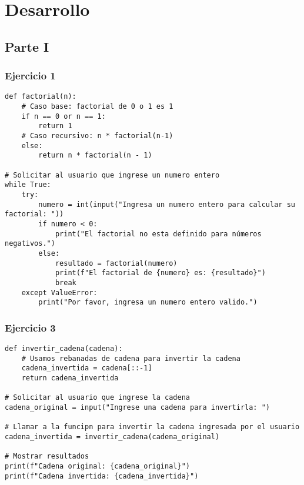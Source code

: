 \documentclass[10pt,a4paper]{article}
\begin{document}
\section{Desarrollo}
\subsection{Parte I}

\subsubsection{Ejercicio 1}
\begin{lstlisting}
def factorial(n):
    # Caso base: factorial de 0 o 1 es 1
    if n == 0 or n == 1:
        return 1
    # Caso recursivo: n * factorial(n-1)
    else:
        return n * factorial(n - 1)

# Solicitar al usuario que ingrese un numero entero
while True:
    try:
        numero = int(input("Ingresa un numero entero para calcular su factorial: "))
        if numero < 0:
            print("El factorial no esta definido para números negativos.")
        else:
            resultado = factorial(numero)
            print(f"El factorial de {numero} es: {resultado}")
            break
    except ValueError:
        print("Por favor, ingresa un numero entero valido.")  

\end{lstlisting}



\subsubsection{Ejercicio 3}
\begin{lstlisting}
def invertir_cadena(cadena):
    # Usamos rebanadas de cadena para invertir la cadena
    cadena_invertida = cadena[::-1]
    return cadena_invertida

# Solicitar al usuario que ingrese la cadena
cadena_original = input("Ingrese una cadena para invertirla: ")

# Llamar a la funcipn para invertir la cadena ingresada por el usuario
cadena_invertida = invertir_cadena(cadena_original)

# Mostrar resultados
print(f"Cadena original: {cadena_original}")
print(f"Cadena invertida: {cadena_invertida}")

\end{lstlisting}
\end{document}
